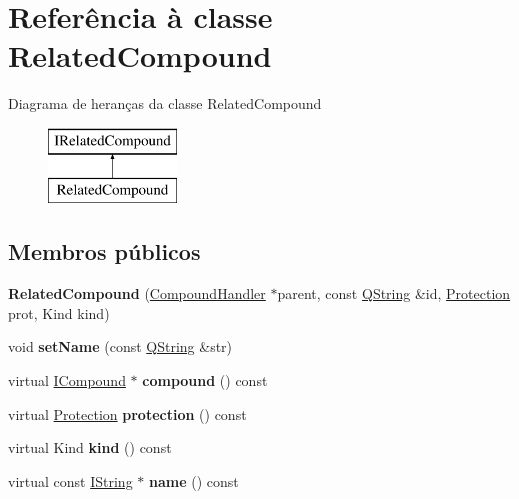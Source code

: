 \hypertarget{class_related_compound}{\section{Referência à classe Related\-Compound}
\label{class_related_compound}
}
Diagrama de heranças da classe Related\-Compound\begin{figure}[H]
\begin{center}
\leavevmode
\includegraphics[height=2.000000cm]{class_related_compound}
\end{center}
\end{figure}
\subsection*{Membros públicos}
\begin{DoxyCompactItemize}
\item 
\hypertarget{class_related_compound_ab5a891d02b3c3432dea0330d896ac659}{{\bfseries Related\-Compound} (\hyperlink{class_compound_handler}{Compound\-Handler} $\ast$parent, const \hyperlink{class_q_string}{Q\-String} \&id, \hyperlink{types_8h_a90e352184df58cd09455fe9996cd4ded}{Protection} prot, Kind kind)}\label{class_related_compound_ab5a891d02b3c3432dea0330d896ac659}

\item 
\hypertarget{class_related_compound_a268d05e0bdd3aee81ec51068533fd89b}{void {\bfseries set\-Name} (const \hyperlink{class_q_string}{Q\-String} \&str)}\label{class_related_compound_a268d05e0bdd3aee81ec51068533fd89b}

\item 
\hypertarget{class_related_compound_aa2377116cf3d80b3fed3cd9963fd509d}{virtual \hyperlink{class_i_compound}{I\-Compound} $\ast$ {\bfseries compound} () const }\label{class_related_compound_aa2377116cf3d80b3fed3cd9963fd509d}

\item 
\hypertarget{class_related_compound_ae4e84f98f2ce6acbab87c5baa083bde2}{virtual \hyperlink{types_8h_a90e352184df58cd09455fe9996cd4ded}{Protection} {\bfseries protection} () const }\label{class_related_compound_ae4e84f98f2ce6acbab87c5baa083bde2}

\item 
\hypertarget{class_related_compound_af8e62c8a81ddf2283205cc8955de50eb}{virtual Kind {\bfseries kind} () const }\label{class_related_compound_af8e62c8a81ddf2283205cc8955de50eb}

\item 
\hypertarget{class_related_compound_a61b3e127d271cd613cc928e35f60125e}{virtual const \hyperlink{class_i_string}{I\-String} $\ast$ {\bfseries name} () const }\label{class_related_compound_a61b3e127d271cd613cc928e35f60125e}

\end{DoxyCompactItemize}
